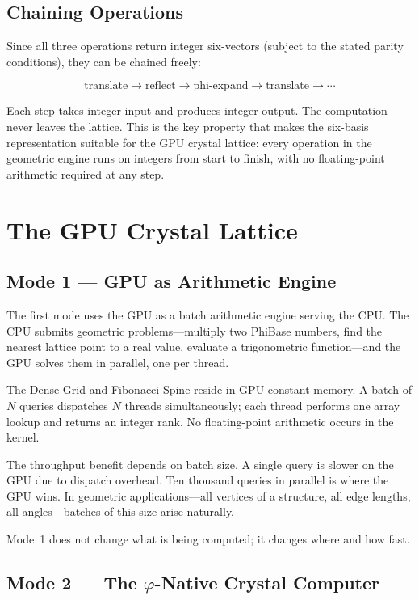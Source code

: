 \documentclass[12pt]{article}
\theoremstyle{definition}
\theoremstyle{remark}
\begin{document}
\subsection{Chaining Operations}

Since all three operations return integer six-vectors (subject to the
stated parity conditions), they can be chained freely:

\[
  \text{translate} \to \text{reflect} \to \text{phi-expand}
  \to \text{translate} \to \cdots
\]

Each step takes integer input and produces integer output.  The
computation never leaves the lattice.  This is the key property
that makes the six-basis representation suitable for the GPU crystal
lattice: every operation in the geometric engine runs on integers from
start to finish, with no floating-point arithmetic required at any step.

\section{The GPU Crystal Lattice}
\label{sec:gpu}

\subsection{Mode 1 — GPU as Arithmetic Engine}

The first mode uses the GPU as a batch arithmetic engine serving the
CPU.  The CPU submits geometric problems---multiply two PhiBase numbers,
find the nearest lattice point to a real value, evaluate a trigonometric
function---and the GPU solves them in parallel, one per thread.

The Dense Grid and Fibonacci Spine reside in GPU constant memory.
A batch of $N$ queries dispatches $N$ threads simultaneously; each
thread performs one array lookup and returns an integer rank.  No
floating-point arithmetic occurs in the kernel.

The throughput benefit depends on batch size.  A single query is slower
on the GPU due to dispatch overhead.  Ten thousand queries in parallel
is where the GPU wins.  In geometric applications---all vertices of a
structure, all edge lengths, all angles---batches of this size arise
naturally.

Mode~1 does not change what is being computed; it changes where and
how fast.

\subsection{Mode 2 — The $\varphi$-Native Crystal Computer}
\end{document}

